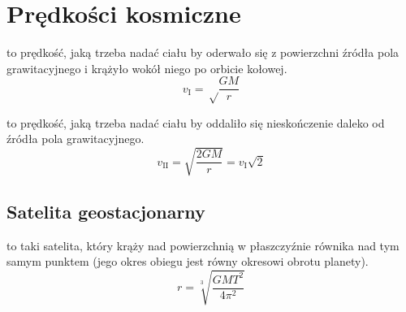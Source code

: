   \section{Prędkości kosmiczne}
    \begin{definition}
       to prędkość, jaką trzeba nadać ciału by oderwało się z powierzchni źródła pola grawitacyjnego i krążyło wokół niego po orbicie kołowej.
      \begin{equation*}
        v_{\scriptscriptstyle\mathrm I} = \sqrt\frac{GM}{r}
      \end{equation*}
    \end{definition}
    \begin{definition}
       to prędkość, jaką trzeba nadać ciału by oddaliło się nieskończenie daleko od źródła pola grawitacyjnego.
      \begin{equation*}
        v_{\scriptscriptstyle\mathrm{II}} = \sqrt{\frac{2GM}{r}} = v_{\scriptscriptstyle\mathrm I}\sqrt2
      \end{equation*}
    \end{definition}
    \subsection{Satelita geostacjonarny}
      \begin{definition}
         to taki satelita, który krąży nad powierzchnią w płaszczyźnie równika nad tym samym punktem (jego okres obiegu jest równy okresowi obrotu planety).
        \begin{equation*}
          r = \sqrt[3]{\frac{GMT^2}{4\pi^2}}
        \end{equation*}
      \end{definition}

